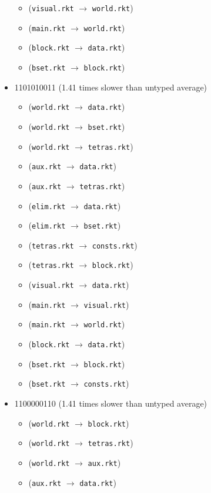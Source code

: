 \documentclass{article}
\newcommand{\mono}[1]{\texttt{#1}}
\begin{document}
\begin{itemize}
\begin{itemize}
  \item (\mono{visual.rkt} $\rightarrow$ \mono{world.rkt})
  \item (\mono{main.rkt} $\rightarrow$ \mono{world.rkt})
  \item (\mono{block.rkt} $\rightarrow$ \mono{data.rkt})
  \item (\mono{bset.rkt} $\rightarrow$ \mono{block.rkt})
  \end{itemize}
\item 1101010011 (1.41 times slower than untyped average)
  \begin{itemize}
  \item (\mono{world.rkt} $\rightarrow$ \mono{data.rkt})
  \item (\mono{world.rkt} $\rightarrow$ \mono{bset.rkt})
  \item (\mono{world.rkt} $\rightarrow$ \mono{tetras.rkt})
  \item (\mono{aux.rkt} $\rightarrow$ \mono{data.rkt})
  \item (\mono{aux.rkt} $\rightarrow$ \mono{tetras.rkt})
  \item (\mono{elim.rkt} $\rightarrow$ \mono{data.rkt})
  \item (\mono{elim.rkt} $\rightarrow$ \mono{bset.rkt})
  \item (\mono{tetras.rkt} $\rightarrow$ \mono{consts.rkt})
  \item (\mono{tetras.rkt} $\rightarrow$ \mono{block.rkt})
  \item (\mono{visual.rkt} $\rightarrow$ \mono{data.rkt})
  \item (\mono{main.rkt} $\rightarrow$ \mono{visual.rkt})
  \item (\mono{main.rkt} $\rightarrow$ \mono{world.rkt})
  \item (\mono{block.rkt} $\rightarrow$ \mono{data.rkt})
  \item (\mono{bset.rkt} $\rightarrow$ \mono{block.rkt})
  \item (\mono{bset.rkt} $\rightarrow$ \mono{consts.rkt})
  \end{itemize}
\item 1100000110 (1.41 times slower than untyped average)
  \begin{itemize}
  \item (\mono{world.rkt} $\rightarrow$ \mono{block.rkt})
  \item (\mono{world.rkt} $\rightarrow$ \mono{tetras.rkt})
  \item (\mono{world.rkt} $\rightarrow$ \mono{aux.rkt})
  \item (\mono{aux.rkt} $\rightarrow$ \mono{data.rkt})

\end{itemize}
\end{itemize}
\end{document}
